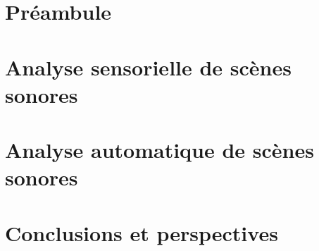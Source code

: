 \documentclass[ twoside,openright,titlepage,numbers=noenddot,headinclude,%
                footinclude=true,cleardoublepage=empty,abstractoff, %
                BCOR=5mm,paper=a4,fontsize=11pt,%
                francais,ngerman,american%
                ]{scrreprt}
\begin{document}
\frenchspacing
\raggedbottom
{} %
\pagestyle{plain}




\cleardoublepage
\cleardoublepage
\cleardoublepage
\cleardoublepage
\pagestyle{scrheadings}
\cleardoublepage

\cleardoublepage{}

\cleardoublepage
{}
\part{Préambule}



\cleardoublepage
{}
\part{Analyse sensorielle de scènes sonores}




\cleardoublepage
{}
\part{Analyse automatique de scènes sonores}




\cleardoublepage
{}
\part{Conclusions et perspectives}



\appendix
\cleardoublepage
\end{document}
